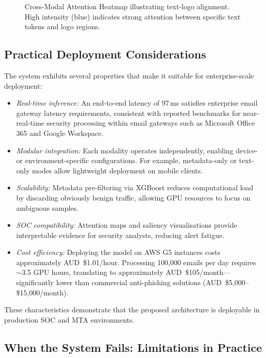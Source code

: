 \documentclass[conference]{IEEEtran}
\begin{document}
\begin{figure}[t]
    \centering
    \caption{Cross-Modal Attention Heatmap illustrating text-logo alignment. High intensity (blue) indicates strong attention between specific text tokens and logo regions.}
    \label{fig:heatmap}
\end{figure}

\subsection{Practical Deployment Considerations}

The system exhibits several properties that make it suitable for enterprise-scale deployment:
\begin{itemize}
    \item \textit{Real-time inference:} An end-to-end latency of 97\,ms satisfies enterprise email gateway latency requirements, consistent with reported benchmarks for near-real-time security processing within email gateways such as Microsoft Office 365 and Google Workspace.
    \item \textit{Modular integration:} Each modality operates independently, enabling device- or environment-specific configurations. For example, metadata-only or text-only modes allow lightweight deployment on mobile clients.
    \item \textit{Scalability:} Metadata pre-filtering via XGBoost reduces computational load by discarding obviously benign traffic, allowing GPU resources to focus on ambiguous samples.
    \item \textit{SOC compatibility:} Attention maps and saliency visualisations provide interpretable evidence for security analysts, reducing alert fatigue.
    \item \textit{Cost efficiency:} Deploying the model on AWS G5 instances costs approximately AUD~\$1.01/hour. Processing 100,000 emails per day requires $\sim$3.5 GPU hours, translating to approximately AUD~\$105/month---significantly lower than commercial anti-phishing solutions (AUD~\$5,000--\$15,000/month).
\end{itemize}

These characteristics demonstrate that the proposed architecture is deployable in production SOC and MTA environments.

\subsection{When the System Fails: Limitations in Practice}
\end{document}
